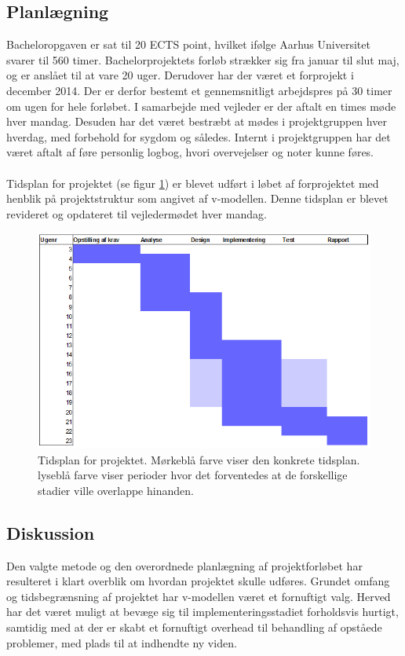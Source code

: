 \documentclass[rapport.tex]{subfiles}
\begin{document}
	\subsection{Planlægning}
	Bacheloropgaven er sat til 20 ECTS point, hvilket ifølge Aarhus Universitet svarer til 560 timer. Bachelorprojektets forløb strækker sig fra januar til slut maj, og er anslået til at vare 20 uger. Derudover har der været et forprojekt i december 2014. Der er derfor bestemt et gennemsnitligt arbejdspres på 30 timer om ugen for hele forløbet. I samarbejde med vejleder er der aftalt en times møde hver mandag. Desuden har det været bestræbt at mødes i projektgruppen hver hverdag, med forbehold for sygdom og således. Internt i projektgruppen har det været aftalt af føre personlig logbog, hvori overvejelser og noter kunne føres. \\
	\\
	Tidsplan for projektet (se figur \ref{fig:Tidsplan}) er blevet udført i løbet af forprojektet med henblik på projektstruktur som angivet af v-modellen. Denne tidsplan er blevet revideret og opdateret til vejledermødet hver mandag. 
	
	\begin{figure}
	\centering
	\includegraphics[width=1\linewidth]{Tidsplan}
	\caption[Tidsplan for projektet]{Tidsplan for projektet. Mørkeblå farve viser den konkrete tidsplan. lyseblå farve viser perioder hvor det forventedes at de forskellige stadier ville overlappe hinanden.}
	\label{fig:Tidsplan}
	\end{figure}
	
	\subsection{Diskussion}
	Den valgte metode og den overordnede planlægning af projektforløbet har resulteret i klart overblik om hvordan projektet skulle udføres. Grundet omfang og tidsbegrænsning af projektet har v-modellen været et fornuftigt valg. Herved har det været muligt at bevæge sig til implementeringsstadiet forholdsvis hurtigt, samtidig med at der er skabt et fornuftigt overhead til behandling af opståede problemer, med plads til at indhendte ny viden. 
	
		
\end{document}
